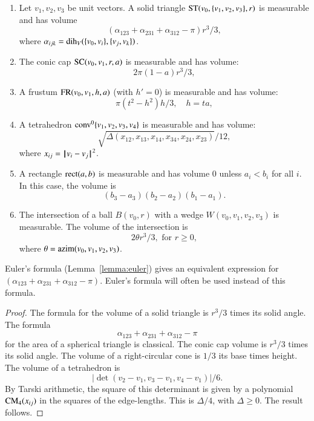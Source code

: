 \begin{lemma} 
\begin{enumerate} 
 \item {} Let $v_1,v_2,v_3$ be unit vectors.
   A solid triangle ${\operatorname{ST}}(v_0,\{v_1,v_2,v_3\},r)$ is measurable and has volume
   $$
   (\alpha_{123}+\alpha_{231}+\alpha_{312}-\pi)r^3/3,
   $$
   where $\alpha_{ijk} = \operatorname{dih}_V(\{v_0,v_i\},\{v_j,v_k\})$.
  \item {} The conic cap ${\operatorname{SC}}(v_0,v_1,r,a)$ is measurable and has volume:
   $$
    2\pi(1-a) r^3/3,
   $$
 \item {} A frustum ${\operatorname{FR}}(v_0,v_1,h,a)$ (with $h'=0$) 
is measurable and has volume:
   $$
   \pi (t^2-h^2) h/3,\quad h = t a, 
   $$
 \item{} A tetrahedron ${\operatorname{conv}}^0\{v_1,v_2,v_3,v_4\}$ is measurable and has volume:
   $$
   \sqrt{\Delta(x_{12},x_{13},x_{14},x_{34},x_{24},x_{23})}/12,
   $$
   where $x_{ij} = {\hskip0.1em|\hskip-0.15em|\hskip0.1em}v_i - v_j{\hskip0.1em|\hskip-0.15em|\hskip0.1em}^2$.
\item{} A rectangle ${\operatorname{rect}}(a,b)$ is measurable and
has volume $0$ unless $a_i<b_i$ for all $i$.  In this case, the
volume is
$$(b_3-a_3)(b_2-a_2)(b_1-a_1).$$
 \item{} The intersection of a ball $B(v_0,r)$ with a wedge
 $W(v_0,v_1,v_2,v_3)$ is measurable.  The volume of the intersection
is 
   $$
   2 \theta r^3/3,\text{ for } r \ge 0,
   $$
where $\theta = {\operatorname{azim}}(v_0,v_1,v_2,v_3)$.

\end{enumerate}
\end{lemma}

Euler's formula (Lemma~\ref{lemma:euler}) gives an
equivalent expression for $(\alpha_{123}+\alpha_{231}+\alpha_{312}-\pi)$.
Euler's formula will often be used instead of this formula.

\begin{proof}
The formula for the volume of a solid triangle is $r^3/3$ times
its solid angle.  The formula 
   $$\alpha_{123}+\alpha_{231}+\alpha_{312}-\pi$$
for the area of a spherical triangle is classical.    
The conic cap volume is
$r^3/3$ times its solid angle.  
The volume of a right-circular cone is $1/3$ its base times height.
The volume of a tetrahedron is
   $$|\det(v_2-v_1,v_3-v_1,v_4-v_1)|/6.$$
By Tarski arithmetic, %
the square of this determinant is given by a polynomial
${\operatorname{CM}}_4(x_{ij})$ in the squares of the edge-lengths. This is
$\Delta/4$, with $\Delta\ge0$.  The result follows.
\end{proof}



